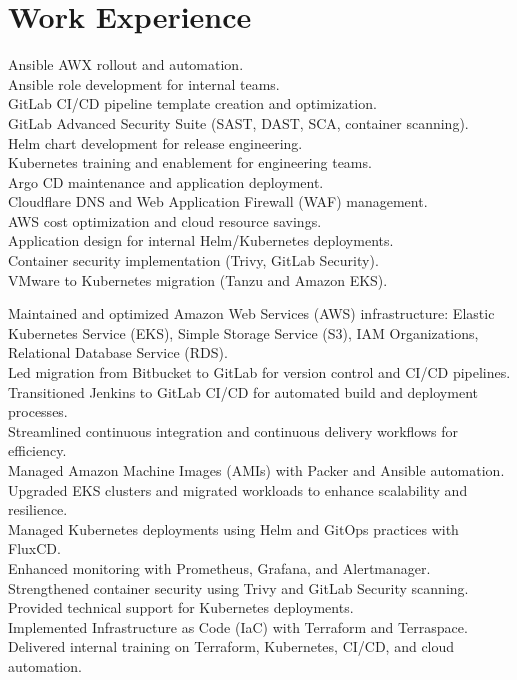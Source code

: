 \documentclass[10pt,a4paper,sans]{moderncv}
\begin{document}
\section{Work Experience}

{
	Ansible AWX rollout and automation.\\
	Ansible role development for internal teams.\\
	GitLab CI/CD pipeline template creation and optimization.\\
	GitLab Advanced Security Suite (SAST, DAST, SCA, container scanning).\\
	Helm chart development for release engineering.\\
	Kubernetes training and enablement for engineering teams.\\
	Argo CD maintenance and application deployment.\\
	Cloudflare DNS and Web Application Firewall (WAF) management.\\
	AWS cost optimization and cloud resource savings.\\
	Application design for internal Helm/Kubernetes deployments.\\
	Container security implementation (Trivy, GitLab Security).\\
	VMware to Kubernetes migration (Tanzu and Amazon EKS).\\
}

{
	Maintained and optimized Amazon Web Services (AWS) infrastructure: Elastic Kubernetes Service (EKS), Simple Storage Service (S3), IAM Organizations, Relational Database Service (RDS).\\
	Led migration from Bitbucket to GitLab for version control and CI/CD pipelines.\\
	Transitioned Jenkins to GitLab CI/CD for automated build and deployment processes.\\
	Streamlined continuous integration and continuous delivery workflows for efficiency.\\
	Managed Amazon Machine Images (AMIs) with Packer and Ansible automation.\\
	Upgraded EKS clusters and migrated workloads to enhance scalability and resilience.\\
	Managed Kubernetes deployments using Helm and GitOps practices with FluxCD.\\
	Enhanced monitoring with Prometheus, Grafana, and Alertmanager.\\
	Strengthened container security using Trivy and GitLab Security scanning.\\
	Provided technical support for Kubernetes deployments.\\
	Implemented Infrastructure as Code (IaC) with Terraform and Terraspace.\\
	Delivered internal training on Terraform, Kubernetes, CI/CD, and cloud automation.\\
}
\end{document}
